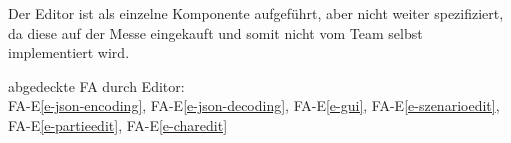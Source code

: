 Der Editor ist als einzelne Komponente aufgeführt, aber nicht weiter spezifiziert, da diese auf der Messe eingekauft und somit nicht vom Team selbst implementiert wird.\\ 
\newline
abgedeckte FA durch Editor:\\
FA-E\ref{e-json-encoding}, FA-E\ref{e-json-decoding}, FA-E\ref{e-gui}, FA-E\ref{e-szenarioedit}, FA-E\ref{e-partieedit}, FA-E\ref{e-charedit}\\

\hspace{1cm}

